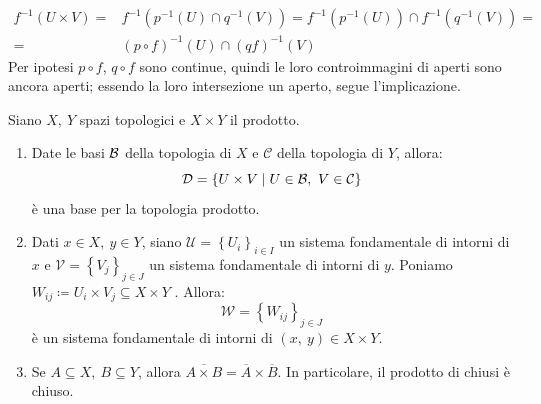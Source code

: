\begin{demonstration}
\begin{enumerate}[label=\Roman*]
\begin{align*}
f^{-1}\left(U\times V\right)=&f^{-1}\left(p^{-1}\left(U\right)\cap q^{-1}\left(V\right)\right)=f^{-1}\left(p^{-1}\left(U\right)\right)\cap f^{-1}\left(q^{-1}\left(V\right)\right)= \\
=& \left(p\circ f\right)^{-1}\left(U\right)\cap \left(qf\right)^{-1}\left(V\right)
\end{align*}
Per ipotesi $p\circ f$, $q\circ f$ sono continue, quindi le loro controimmagini di aperti sono ancora aperti; essendo la loro intersezione un aperto, segue l'implicazione.
\end{enumerate}
\end{demonstration}
\begin{proposition}
Siano $X,\ Y$ spazi topologici e $X\times Y$ il prodotto.
\begin{enumerate}
\item Date le basi $\mathcal{B}$ della topologia di $X$ e $\mathcal{C}$ della topologia di $Y$, allora:
\begin{equation}
\mathcal{D}=\left\{U\times V\mid U\in\mathcal{B},\ V\in\mathcal{C}\right\}
\end{equation}
è una base per la topologia prodotto.
\item Dati $x\in X,\ y\in Y$, siano $\mathcal{U} = \left\{U_i\right\}_{i\in I}$ un
sistema fondamentale di intorni di $x$ e $\mathcal{V} = \left\{V_j\right\}_{j\in J}$ un sistema fondamentale di intorni di $y$. Poniamo $W_{ij} \coloneqq U_i \times V_j \subseteq X \times Y$ . Allora:
\begin{equation}
\mathcal{W} = \left\{W_{ij}\right\}_{j\in J}
\end{equation}
è un sistema fondamentale di intorni di $\left(x,\ y\right) \in X \times Y$.
\item Se $A\subseteq X,\ B\subseteq Y$, allora $\overline{A\times B}=\overline{A}\times \overline{B}$. In particolare, il prodotto di chiusi è chiuso.
\end{enumerate}
\vspace{-3mm}
\end{proposition}
